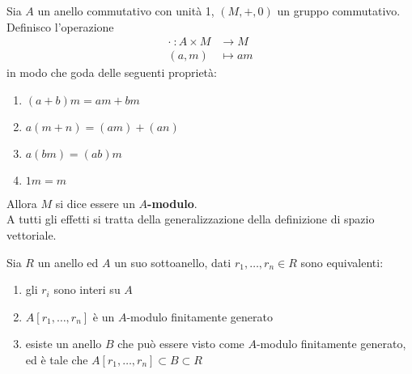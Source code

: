 \begin{definizione}[$A$-modulo]
	Sia $A$ un anello commutativo con unità 1, $(M,+,0)$ un gruppo commutativo. Definisco l'operazione 
	\begin{align*}
	\cdot \ : A\times M &\longrightarrow M\\
	(a,m)&\longmapsto am
	\end{align*}
	in modo che goda delle seguenti proprietà:
	\begin{enumerate}
		\item $(a+b)m=am+bm$
		\item $a(m+n)=(am)+(an)$
		\item $a(bm)=(ab)m$
		\item $1m=m$
	\end{enumerate}
	Allora $M$ si dice essere un \textbf{$A$-modulo}. \\ A tutti gli effetti si tratta della generalizzazione della definizione di spazio vettoriale.
\end{definizione}
\begin{proposizione}
	Sia $R$ un anello ed $A$ un suo sottoanello, dati $r_1,\dots,r_n\in R$ sono equivalenti:
	\begin{enumerate}
		\item gli $r_i$ sono interi su $A$
		\item $A[r_1,\dots,r_n]$ è un $A$-modulo finitamente generato
		\item esiste un anello $B$ che può essere visto come $A$-modulo finitamente generato, ed è tale che $A[r_1,\dots,r_n]\subset B\subset R$
	\end{enumerate}
\end{proposizione}
